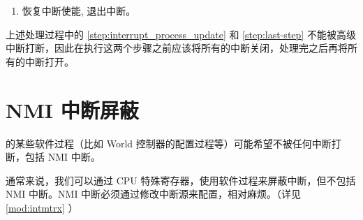 \documentclass[main\_\_CN.tex]{subfiles}
\begin{document}
\begin{enumerate}
\begin{enumerate}
                \item 查询需前往的世界：
                    \begin{itemize}
                        \item 如仍处于相同世界，则跳转到第 \ref{step:final} 步。
                        \item 如需前往其他世界，则切换至需要的世界，参考\ref{sec:38-WCTRL-recommended-operation}。然后跳转到第 \ref{step:final} 步。
                    \end{itemize}
            \end{enumerate}
        \item 恢复中断使能, 退出中断。 \label{step:final}
\end{enumerate}


\begin{tiplisting}
上述处理过程中的 \ref{step:interrupt_process_update} 和 \ref{step:last-step} 不能被高级中断打断，因此在执行这两个步骤之前应该将所有的中断关闭，处理完之后再将所有的中断打开。
\end{tiplisting}

\section{NMI 中断屏蔽}

\chipname{} 的某些软件过程（比如 World 控制器的配置过程等）可能希望不被任何中断打断，包括 NMI 中断。

通常来说，我们可以通过 CPU 特殊寄存器，使用软件过程来屏蔽中断，但不包括 NMI 中断。NMI 中断必须通过修改中断源来配置，相对麻烦。（详见 \ref{mod:intmtrx} \textit{} ）
\end{document}
